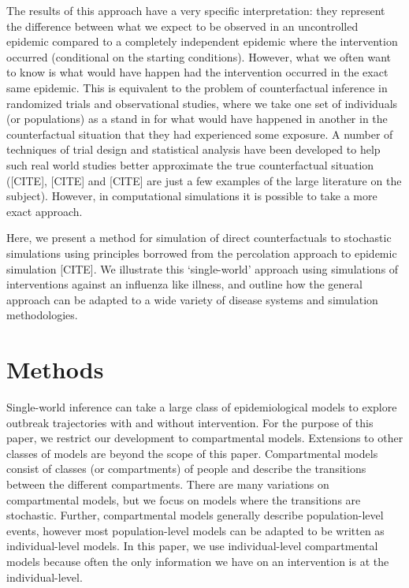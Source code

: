 \documentclass[PTRSB]{rsos}
\begin{document}
\begin{multicols}{2}
The results of this approach have a very specific interpretation: they represent the difference between what we expect to be observed in an uncontrolled epidemic compared to a completely independent epidemic where the intervention occurred (conditional on the starting conditions).
However, what we often want to know is what would have happen had the intervention occurred in the exact same epidemic.
This is equivalent to the problem of counterfactual inference in randomized trials and observational studies, where we take one set of individuals (or populations) as a stand in for what would have happened in another in the counterfactual situation that they had experienced some exposure.
A number of techniques of trial design and statistical analysis have been developed to help such real world studies better approximate the true counterfactual situation ([CITE], [CITE] and [CITE] are just a few examples of the large literature on the subject).
However, in computational simulations it is possible to take a more exact approach.

Here, we present a method for simulation of direct counterfactuals to stochastic simulations using principles borrowed from the percolation approach to epidemic simulation [CITE].
We illustrate this ‘single-world’ approach using simulations of interventions against an influenza like illness, and outline how the general approach can be adapted to a wide variety of disease systems and simulation methodologies.

\section{Methods}
Single-world inference can take a large class of epidemiological models to explore outbreak trajectories with and without intervention. 
For the purpose of this paper, we restrict our development to compartmental models.
Extensions to other classes of models are beyond the scope of this paper.
Compartmental models consist of classes (or compartments) of people and describe the transitions between the different compartments.
There are many variations on compartmental models, but we focus on models where the transitions are stochastic.
Further, compartmental models generally describe population-level events, however most population-level models can be adapted to be written as individual-level models.
In this paper, we use individual-level compartmental models because often the only information we have on an intervention is at the individual-level.


\end{multicols}
\end{document}
